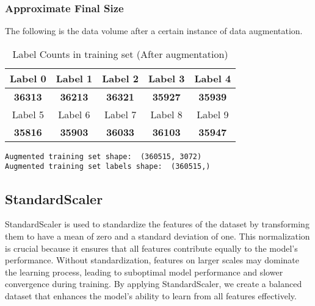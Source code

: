 \documentclass[a4paper,11pt]{article}
\begin{document}
\subsubsection{Approximate Final Size}
The following is the data volume after a certain instance of data augmentation.

\begin{table}[h]
    \centering
    \begin{tabular}{|c|c|c|c|c|}
        \hline
        Label 0 & Label 1 & Label 2 & Label 3 & Label 4 \\
        \hline
        \textbf{36313} & \textbf{36213} & \textbf{36321} & \textbf{35927} & \textbf{35939} \\
        \hline
        Label 5 & Label 6 & Label 7 & Label 8 & Label 9 \\
        \hline
        \textbf{35816} & \textbf{35903} & \textbf{36033} & \textbf{36103} & \textbf{35947} \\
        \hline
    \end{tabular}
    \caption{Label Counts in training set (After augmentation)}
    \label{tab:example}
\end{table}

\begin{verbatim}
Augmented training set shape:  (360515, 3072)
Augmented training set labels shape:  (360515,)
\end{verbatim}

\subsection{StandardScaler}
StandardScaler is used to standardize the features of the dataset by transforming them to have a mean of zero and a standard deviation of one. This normalization is crucial because it ensures that all features contribute equally to the model's performance. Without standardization, features on larger scales may dominate the learning process, leading to suboptimal model performance and slower convergence during training. By applying StandardScaler, we create a balanced dataset that enhances the model's ability to learn from all features effectively.
\end{document}
